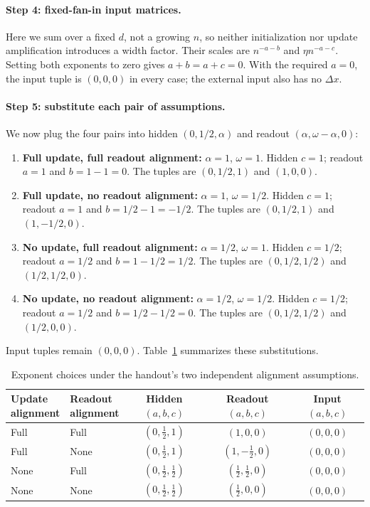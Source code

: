 \documentclass{article}
\begin{document}
\paragraph{Step 4: fixed-fan-in input matrices.}
Here we sum over a fixed $d$, not a growing $n$, so neither initialization
nor update amplification introduces a width factor. Their scales are
$n^{-a-b}$ and $\eta n^{-a-c}$. Setting both exponents to zero gives
$a+b=a+c=0$. With the required $a=0$, the input tuple is $(0,0,0)$
in every case; the external input also has no $\Delta x$.

\paragraph{Step 5: substitute each pair of assumptions.}
We now plug the four pairs into hidden $(0,1/2,\alpha)$ and readout
$(\alpha,\omega-\alpha,0)$:
\begin{enumerate}
    \item \textbf{Full update, full readout alignment:}
    $\alpha=1$, $\omega=1$. Hidden $c=1$; readout $a=1$ and
    $b=1-1=0$. The tuples are $(0,1/2,1)$ and $(1,0,0)$.
    \item \textbf{Full update, no readout alignment:}
    $\alpha=1$, $\omega=1/2$. Hidden $c=1$; readout $a=1$ and
    $b=1/2-1=-1/2$. The tuples are $(0,1/2,1)$ and $(1,-1/2,0)$.
    \item \textbf{No update, full readout alignment:}
    $\alpha=1/2$, $\omega=1$. Hidden $c=1/2$; readout $a=1/2$ and
    $b=1-1/2=1/2$. The tuples are $(0,1/2,1/2)$ and $(1/2,1/2,0)$.
    \item \textbf{No update, no readout alignment:}
    $\alpha=1/2$, $\omega=1/2$. Hidden $c=1/2$; readout $a=1/2$ and
    $b=1/2-1/2=0$. The tuples are $(0,1/2,1/2)$ and $(1/2,0,0)$.
\end{enumerate}
Input tuples remain $(0,0,0)$. Table~\ref{tab:p40-abc} summarizes these
substitutions.

\begin{table}[ht]
\centering
\small
\begin{tabular}{llccc}
\toprule
\shortstack{Update\\alignment} & \shortstack{Readout\\alignment} &
\shortstack{Hidden\\$(a,b,c)$} & \shortstack{Readout\\$(a,b,c)$} & \shortstack{Input\\$(a,b,c)$} \\
\midrule
Full & Full & $(0,\frac12,1)$ & $(1,0,0)$ & $(0,0,0)$ \\
Full & None & $(0,\frac12,1)$ & $(1,-\frac12,0)$ & $(0,0,0)$ \\
None & Full & $(0,\frac12,\frac12)$ & $(\frac12,\frac12,0)$ & $(0,0,0)$ \\
None & None & $(0,\frac12,\frac12)$ & $(\frac12,0,0)$ & $(0,0,0)$ \\
\bottomrule
\end{tabular}
\caption{Exponent choices under the handout's two independent alignment assumptions.}
\label{tab:p40-abc}
\end{table}
\end{document}
